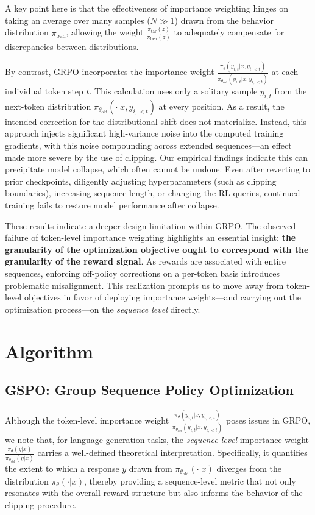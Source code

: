 A key point here is that the effectiveness of importance weighting hinges on taking an average over many samples ($N \gg 1$) drawn from the behavior distribution $\pi_\text{beh}$, allowing the weight $\frac{ \pi_\text{tar} (z) }{ \pi_\text{beh} (z)}$ to adequately compensate for discrepancies between distributions.

By contrast, GRPO incorporates the importance weight $\frac{ \pi_{\theta} (y_{i,t} | x, y_{i,<t}) }{ \pi_{\theta_\text{old}} (y_{i,t} | x,y_{i,<t})}$ at each individual token step $t$. This calculation uses only a solitary sample $y_{i,t}$ from the next-token distribution $\pi_{\theta_\text{old}}( \cdot | x, y_{i,<t})$ at every position. As a result, the intended correction for the distributional shift does not materialize. Instead, this approach injects significant high-variance noise into the computed training gradients, with this noise compounding across extended sequences—an effect made more severe by the use of clipping. Our empirical findings indicate this can precipitate model collapse, which often cannot be undone. Even after reverting to prior checkpoints, diligently adjusting hyperparameters (such as clipping boundaries), increasing sequence length, or changing the RL queries, continued training fails to restore model performance after collapse.

These results indicate a deeper design limitation within GRPO. The observed failure of token-level importance weighting highlights an essential insight: \textbf{the granularity of the optimization objective ought to correspond with the granularity of the reward signal}. As rewards are associated with entire sequences, enforcing off-policy corrections on a per-token basis introduces problematic misalignment. This realization prompts us to move away from token-level objectives in favor of deploying importance weights—and carrying out the optimization process—on the \textit{sequence level} directly.

\section{Algorithm}

\subsection{GSPO: Group Sequence Policy Optimization}

Although the token-level importance weight $\frac{ \pi_{\theta} (y_{i,t} | x, y_{i,<t}) }{ \pi_{\theta_\text{old}} (y_{i,t} | x,y_{i,<t})}$ poses issues in GRPO, we note that, for language generation tasks, the \textit{sequence-level} importance weight $\frac{ \pi_{\theta} (y | x) }{ \pi_{\theta_\text{old}} (y | x)}$ carries a well-defined theoretical interpretation. Specifically, it quantifies the extent to which a response $y$ drawn from $\pi_{\theta_\text{old}} (\cdot | x)$ diverges from the distribution $\pi_{\theta} (\cdot | x)$, thereby providing a sequence-level metric that not only resonates with the overall reward structure but also informs the behavior of the clipping procedure.

